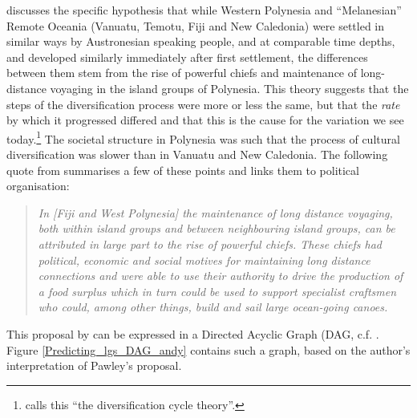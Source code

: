 \documentclass[a4paper,10pt]{article} %
\begin{document}
\citet{pawley81, pawley2007} discusses the specific hypothesis that while Western Polynesia and ``Melanesian'' Remote Oceania (Vanuatu, Temotu, Fiji and New Caledonia) were settled in similar ways by Austronesian speaking people, and at comparable time depths, and developed similarly immediately after first settlement, the differences between them stem from the rise of powerful chiefs and maintenance of long-distance voyaging in the island groups of Polynesia. This theory suggests that the steps of the diversification process were more or less the same, but that the \emph{rate} by which it progressed differed and that this is the cause for the variation we see today.\footnote{\citet{lynch1981melanesian} calls this ``the diversification cycle theory''.} The societal structure in Polynesia was such that the process of cultural diversification was slower than in Vanuatu and New Caledonia. The following quote from \citet{pawley2007} summarises a few of these points and links them to political organisation:


\begin{quotation}
\noindent \emph{In [Fiji and West Polynesia] the maintenance of long distance voyaging, both within island groups and between neighbouring island groups, can be attributed in large part to the rise of powerful chiefs. These chiefs had political, economic and social motives for maintaining long distance connections and were able to use their authority to drive the production of a food surplus which in turn could be used to support specialist craftsmen who could, among other things, build and sail large ocean-going canoes.} \citep[28]{pawley2007} \end{quotation}

This proposal by \citet{pawley81, pawley2007} can be expressed in a Directed Acyclic Graph (DAG, c.f. \cite{mcelreath2020statistical}. Figure \ref{Predicting_lgs_DAG_andy} contains such a graph, based on the author's interpretation of Pawley's proposal.
\end{document}
